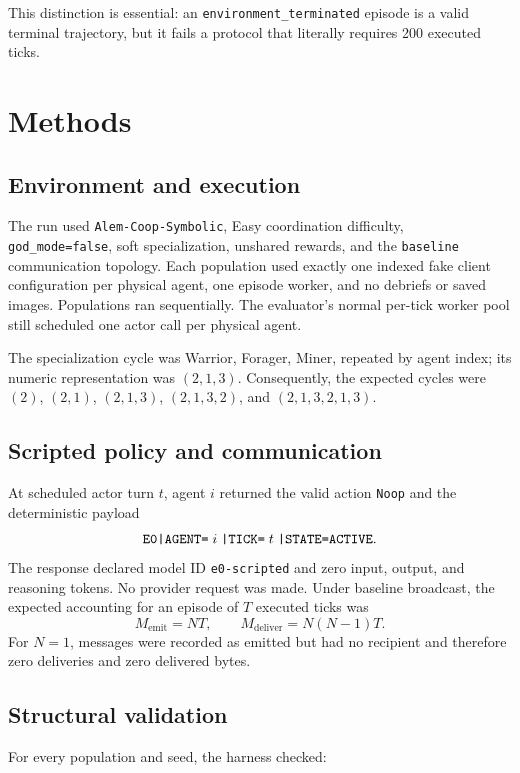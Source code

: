 \documentclass[11pt]{article}
\newcommand{\code}[1]{\texttt{#1}}
\begin{document}
This distinction is essential: an \code{environment\_terminated} episode is a
valid terminal trajectory, but it fails a protocol that literally requires 200
executed ticks.

\section{Methods}

\subsection{Environment and execution}

The run used \code{Alem-Coop-Symbolic}, Easy coordination difficulty,
\code{god\_mode=false}, soft specialization, unshared rewards, and the
\code{baseline} communication topology.  Each population used exactly one
indexed fake client configuration per physical agent, one episode worker, and
no debriefs or saved images.  Populations ran sequentially.  The evaluator's
normal per-tick worker pool still scheduled one actor call per physical agent.

The specialization cycle was Warrior, Forager, Miner, repeated by agent index;
its numeric representation was $(2,1,3)$.  Consequently, the expected cycles
were $(2)$, $(2,1)$, $(2,1,3)$, $(2,1,3,2)$, and
$(2,1,3,2,1,3)$.

\subsection{Scripted policy and communication}

At scheduled actor turn $t$, agent $i$ returned the valid action
\code{Noop} and the deterministic payload
\[
\text{\code{E0|AGENT=}}\;i\;\text{\code{|TICK=}}\;t\;
\text{\code{|STATE=ACTIVE}}.
\]
The response declared model ID \code{e0-scripted} and zero input, output, and
reasoning tokens.  No provider request was made.  Under baseline broadcast, the
expected accounting for an episode of $T$ executed ticks was
\[
M_{\mathrm{emit}}=NT,\qquad
M_{\mathrm{deliver}}=N(N-1)T.
\]
For $N=1$, messages were recorded as emitted but had no recipient and therefore
zero deliveries and zero delivered bytes.

\subsection{Structural validation}

For every population and seed, the harness checked:
\end{document}
